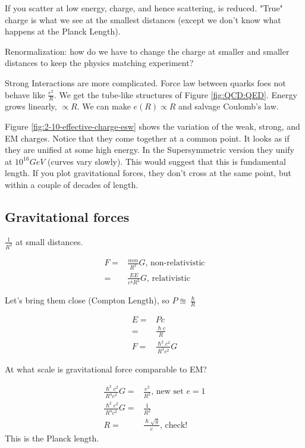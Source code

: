 \documentclass[]{article}
\begin{document}
If you scatter at low energy, charge, and hence scattering, is reduced. "True" charge is what we see at the smallest distances (except we don't know what happens at the Planck Length).

Renormalization: how do we have to change the charge at smaller and smaller distances to keep the physics matching experiment?

Strong Interactions are more complicated. Force law between quarks foes not behave like $\frac{e^2}{R}$. We get the tube-like structures of Figure \ref{fig:QCD:QED}. Energy grows linearly, $\propto R$. We can make $e(R) \propto R$ and salvage Coulomb's law.

Figure \ref{fig:2-10-effective-charge-esw} shows the variation of the weak, strong, and EM charges. Notice that they come together at a common point. It looks as if they are unified at some high energy. In the Supersymmetric version they unify at $10^{16}GeV$ (curves vary slowly). This would suggest that this is fundamental length. If you plot gravitational forces, they don't cross at the same point, but within a couple of decades of length.

\subsection{Gravitational forces}

$\frac{1}{R^3}$ at small distances.

\begin{align*}
	F =& \frac{mm}{R^2}G \text{, non-relativistic}\\
	=& \frac{E E}{c^4 R^2}G \text{,                                              relativistic}
\end{align*}

Let's bring them close (Compton Length), so $P\approxeq\frac{\hslash}{R}$


\begin{align*}
	E =& Pc\\
	=& \frac{\hslash c}{R}\\
	F =& \frac{\hslash^2 c^2}{R^4 c^2}G
\end{align*}

At what scale is gravitational force comparable to EM?

\begin{align*}
	\frac{\hslash^2 c^2}{R^4 c^2}G =& \frac{e^2}{R^2} \text{, new set $e=1$}\\
	\frac{\hslash^2 c^2}{R^4 c^2}G =& \frac{1}{R^2} \\
	R =&\frac{\hslash \sqrt{g}}{c}	\text{, check!}
\end{align*}
This is the Planck length.


\printglossaries


\raggedright

\end{document}
